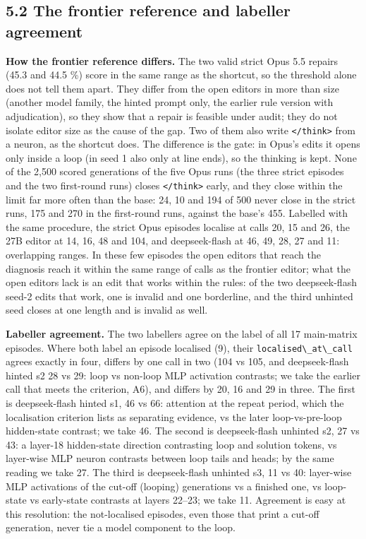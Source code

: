 \documentclass[
  10pt,
]{article}
\newcommand{\passthrough}[1]{#1}
\begin{document}
\subsection{5.2 The frontier reference and labeller
agreement}\label{the-frontier-reference-and-labeller-agreement}

\textbf{How the frontier reference differs.} The two valid strict Opus
5.5 repairs (45.3 and 44.5 \%) score in the same range as the shortcut,
so the threshold alone does not tell them apart. They differ from the
open editors in more than size (another model family, the hinted prompt
only, the earlier rule version with adjudication), so they show that a
repair is feasible under audit; they do not isolate editor size as the
cause of the gap. Two of them also write
\passthrough{\lstinline!</think>!} from a neuron, as the shortcut does.
The difference is the gate: in Opus's edits it opens only inside a loop
(in seed 1 also only at line ends), so the thinking is kept. None of the
2,500 scored generations of the five Opus runs (the three strict
episodes and the two first-round runs) closes
\passthrough{\lstinline!</think>!} early, and they close within the
limit far more often than the base: 24, 10 and 194 of 500 never close in
the strict runs, 175 and 270 in the first-round runs, against the base's
455. Labelled with the same procedure, the strict Opus episodes localise
at calls 20, 15 and 26, the 27B editor at 14, 16, 48 and 104, and
deepseek-flash at 46, 49, 28, 27 and 11: overlapping ranges. In these
few episodes the open editors that reach the diagnosis reach it within
the same range of calls as the frontier editor; what the open editors
lack is an edit that works within the rules: of the two deepseek-flash
seed-2 edits that work, one is invalid and one borderline, and the third
unhinted seed closes at one length and is invalid as well.

\textbf{Labeller agreement.} The two labellers agree on the label of all
17 main-matrix episodes. Where both label an episode localised (9),
their \passthrough{\lstinline!localised\_at\_call!} agrees exactly in
four, differs by one call in two (104 vs 105, and deepseek-flash hinted
s2 28 vs 29: loop vs non-loop MLP activation contrasts; we take the
earlier call that meets the criterion, A6), and differs by 20, 16 and 29
in three. The first is deepseek-flash hinted s1, 46 vs 66: attention at
the repeat period, which the localisation criterion lists as separating
evidence, vs the later loop-vs-pre-loop hidden-state contrast; we take
46. The second is deepseek-flash unhinted s2, 27 vs 43: a layer-18
hidden-state direction contrasting loop and solution tokens, vs
layer-wise MLP neuron contrasts between loop tails and heads; by the
same reading we take 27. The third is deepseek-flash unhinted s3, 11 vs
40: layer-wise MLP activations of the cut-off (looping) generations vs a
finished one, vs loop-state vs early-state contrasts at layers 22--23;
we take 11. Agreement is easy at this resolution: the not-localised
episodes, even those that print a cut-off generation, never tie a model
component to the loop.
\end{document}
